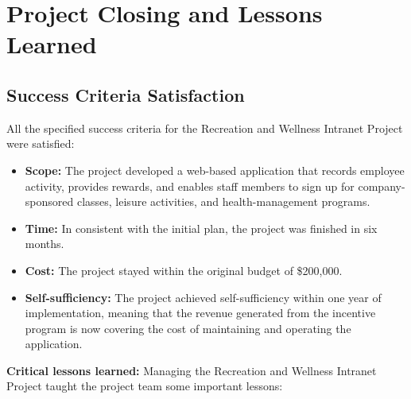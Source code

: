 \chapter{Project Closing and Lessons Learned}

\section{Success Criteria Satisfaction}

All the specified success criteria for the Recreation and Wellness Intranet Project were satisfied:

\begin{itemize}
    \item \textbf{Scope:} The project developed a web-based application that records employee activity, provides rewards, and enables staff members to sign up for company-sponsored classes, leisure activities, and health-management programs.
    \item \textbf{Time:} In consistent with the initial plan, the project was finished in six months.
    \item \textbf{Cost:} The project stayed within the original budget of \$200,000.
    \item \textbf{Self-sufficiency:} The project achieved self-sufficiency within one year of implementation, meaning that the revenue generated from the incentive program is now covering the cost of maintaining and operating the application.
\end{itemize}

\textbf{Critical lessons learned:} Managing the Recreation and Wellness Intranet Project taught the project team some important lessons:

